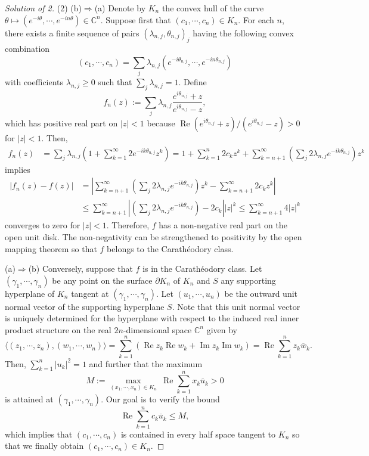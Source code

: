 \documentclass[a4paper]{article}
\theoremstyle{definition}
\renewcommand{\Re}{\operatorname{Re}}
\renewcommand{\Im}{\operatorname{Im}}
\newcommand{\C}{\mathbb{C}}
\renewcommand{\bar}{\overline}
\begin{document}
\begin{proof}[Solution of 2]
(2)
(b)$\Rightarrow$(a)
Denote by $K_n$ the convex hull of the curve $\theta\mapsto(e^{-i\theta},\cdots,e^{-in\theta})\in\C^n$.
Suppose first that $(c_1,\cdots,c_n)\in K_n$.
For each $n$, there exists a finite sequence of pairs $(\lambda_{n,j},\theta_{n,j})_j$ having the following convex combination
\[(c_1,\cdots,c_n)=\sum_j\lambda_{n,j}(e^{-i\theta_{n,j}},\cdots,e^{-in\theta_{n,j}})\]
with coefficients $\lambda_{n,j}\ge0$ such that $\sum_j\lambda_{n,j}=1$.
Define
\[f_n(z):=\sum_j\lambda_{n,j}\frac{e^{i\theta_{n,j}}+z}{e^{i\theta_{n,j}}-z},\]
which has positive real part on $|z|<1$ because $\Re(e^{i\theta_{n,j}}+z)/(e^{i\theta_{n,j}}-z)>0$ for $|z|<1$.
Then,
\begin{align*}
f_n(z)
&=\sum_j\lambda_{n,j}(1+\sum_{k=1}^\infty2e^{-ik\theta_{n,j}}z^k)=1+\sum_{k=1}^n2c_kz^k+\sum_{k=n+1}^\infty\left(\sum_j2\lambda_{n,j}e^{-ik\theta_{n,j}}\right)z^k
\end{align*}
implies
\begin{align*}
|f_n(z)-f(z)|
&=\left|\sum_{k=n+1}^\infty\left(\sum_j2\lambda_{n,j}e^{-ik\theta_{n,j}}\right)z^k-\sum_{k=n+1}^\infty2c_kz^k\right|\\
&\le\sum_{k=n+1}^\infty\left|\left(\sum_j2\lambda_{n,j}e^{-ik\theta_{n,j}}\right)-2c_k\right||z|^k\le\sum_{k=n+1}^\infty4|z|^k
\end{align*}
converges to zero for $|z|<1$.
Therefore, $f$ has a non-negative real part on the open unit disk.
The non-negativity can be strengthened to positivity by the open mapping theorem so that $f$ belongs to the Carath\'eodory class.

(a)$\Rightarrow$(b)
Conversely, suppose that $f$ is in the Carath\'eodory class.
Let $(\gamma_1,\cdots,\gamma_n)$ be any point on the surface $\partial K_n$ of $K_n$ and $S$ any supporting hyperplane of $K_n$ tangent at $(\gamma_1,\cdots,\gamma_n)$.
Let $(u_1,\cdots,u_n)$ be the outward unit normal vector of the supporting hyperplane $S$.
Note that this unit normal vector is uniquely determined for the hyperplane with respect to the induced real inner product structure on the real $2n$-dimensional space $\C^n$ given by
\[\langle(z_1,\cdots,z_n),(w_1,\cdots,w_n)\rangle=\sum_{k=1}^n(\Re z_k\Re w_k+\Im z_k\Im w_k)=\Re\sum_{k=1}^nz_k\bar w_k.\]
Then, $\sum_{k=1}^n|u_k|^2=1$ and further that the maximum
\[M:=\max_{(x_1,\cdots,x_n)\in K_n}\ \Re\sum_{k=1}^nx_k\bar u_k>0\]
is attained at $(\gamma_1,\cdots,\gamma_n)$.
Our goal is to verify the bound
\[\Re\sum_{k=1}^nc_k\bar u_k\le M,\]
which implies that $(c_1,\cdots,c_n)$ is contained in every half space tangent to $K_n$ so that we finally obtain $(c_1,\cdots,c_n)\in K_n$.


\end{proof}
\end{document}
